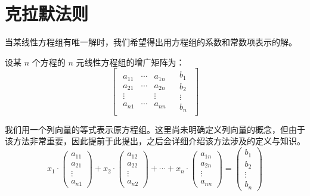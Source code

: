 
\section{克拉默法则}

当某线性方程组有唯一解时，我们希望得出用方程组的系数和常数项表示的解。

设某 $n$ 个方程的 $n$ 元线性方程组的增广矩阵为：
$$
\left[\begin{array}{c|c}
	\begin{matrix}
		a_{11} & \cdots & a_{1n}
		\\
		a_{21} & \cdots & a_{2n}
		\\
		\vdots & & \vdots
		\\
		a_{n1} & \cdots & a_{nn}
	\end{matrix}
	&
	\begin{matrix}
		b_1 \\ b_2 \\ \vdots \\ b_n
	\end{matrix}
\end{array}\right]
$$

我们用一个列向量的等式表示原方程组。这里尚未明确定义列向量的概念，但由于该方法非常重要，因此提前于此提出，之后会详细介绍该方法涉及的定义与知识。
$$
x_1 \cdot \begin{pmatrix} a_{11} \\ a_{21} \\ \vdots \\ a_{n1} \end{pmatrix} +
x_2 \cdot \begin{pmatrix} a_{12} \\ a_{22} \\ \vdots \\ a_{n2} \end{pmatrix} +
\cdots +
x_n \cdot \begin{pmatrix} a_{1n} \\ a_{2n} \\ \vdots \\ a_{nn} \end{pmatrix} =
\begin{pmatrix} b_1 \\ b_2 \\ \vdots \\ b_n \end{pmatrix}
$$

